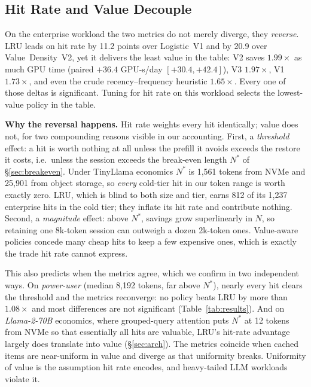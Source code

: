 \documentclass[letterpaper,twocolumn,10pt]{article}
\begin{document}
\subsection{Hit Rate and Value Decouple}
\label{sec:decouple}

On the enterprise workload the two metrics do not merely diverge, they \emph{reverse}. LRU leads on hit rate by 11.2 points over Logistic~V1 and by 20.9 over Value~Density~V2, yet it delivers the least value in the table: V2 saves $1.99\times$ as much GPU time (paired $+36.4$ GPU-s/day $[+30.4, +42.4]$), V3 $1.97\times$, V1 $1.73\times$, and even the crude recency--frequency heuristic $1.65\times$. Every one of those deltas is significant. Tuning for hit rate on this workload selects the lowest-value policy in the table.

\textbf{Why the reversal happens.} Hit rate weights every hit identically; value does not, for two compounding reasons visible in our accounting. First, a \emph{threshold} effect: a hit is worth nothing at all unless the prefill it avoids exceeds the restore it costs, i.e.\ unless the session exceeds the break-even length $N^{*}$ of \S\ref{sec:breakeven}. Under TinyLlama economics $N^{*}$ is 1,561 tokens from NVMe and 25,901 from object storage, so \emph{every} cold-tier hit in our token range is worth exactly zero. LRU, which is blind to both size and tier, earns 812 of its 1,237 enterprise hits in the cold tier; they inflate its hit rate and contribute nothing. Second, a \emph{magnitude} effect: above $N^{*}$, savings grow superlinearly in $N$, so retaining one 8k-token session can outweigh a dozen 2k-token ones. Value-aware policies concede many cheap hits to keep a few expensive ones, which is exactly the trade hit rate cannot express.

This also predicts when the metrics agree, which we confirm in two independent ways. On \emph{power-user} (median 8,192 tokens, far above $N^{*}$), nearly every hit clears the threshold and the metrics reconverge: no policy beats LRU by more than $1.08\times$ and most differences are not significant (Table~\ref{tab:results}). And on \emph{Llama-2-70B} economics, where grouped-query attention puts $N^{*}$ at 12 tokens from NVMe so that essentially all hits are valuable, LRU's hit-rate advantage largely does translate into value (\S\ref{sec:arch}). The metrics coincide when cached items are near-uniform in value and diverge as that uniformity breaks. Uniformity of value is the assumption hit rate encodes, and heavy-tailed LLM workloads violate it.
\end{document}
